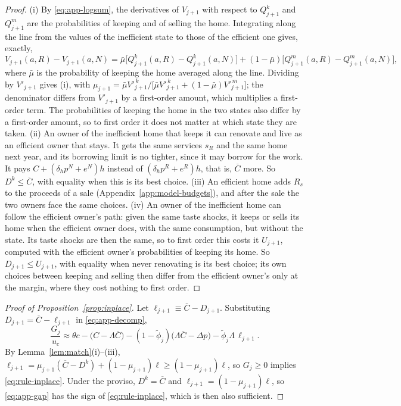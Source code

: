 \begin{proof}
(i) By \eqref{eq:app-logsum}, the derivatives of $V_{j+1}$ with respect to
$Q^k_{j+1}$ and $Q^m_{j+1}$ are the probabilities of keeping and of selling
the home. Integrating along the line from the values of the inefficient
state to those of the efficient one gives, exactly,
\begin{equation*}
  V_{j+1}(a,R)-V_{j+1}(a,N)=\bar\mu\bigl[Q^k_{j+1}(a,R)-Q^k_{j+1}(a,N)\bigr]
  +(1-\bar\mu)\bigl[Q^m_{j+1}(a,R)-Q^m_{j+1}(a,N)\bigr],
\end{equation*}
where $\bar\mu$ is the probability of keeping the home averaged along the
line. Dividing by $V'_{j+1}$ gives (i), with
$\mu_{j+1}=\bar\mu V'^{\,k}_{j+1}/\bigl[\bar\mu V'^{\,k}_{j+1}+(1-\bar\mu)V'^{\,m}_{j+1}\bigr]$;
the denominator differs from $V'_{j+1}$ by a first-order amount, which
multiplies a first-order term. The probabilities of keeping the home in the
two states also differ by a first-order amount, so to first order it does
not matter at which state they are taken. (ii) An owner of the
inefficient home that keeps it can renovate and live as an efficient owner
that stays. It gets the same services $s_R$ and the same home next year,
and its borrowing limit is no tighter, since it may borrow for the work.
It pays $C+(\delta_hp^N+e^N)h$ instead of $(\delta_hp^R+e^R)h$, that is,
$\overline C$ more. So $D^k\le\overline C$, with equality when this is its
best choice. (iii) An efficient home adds $R_s$ to the proceeds of a sale
(Appendix~\ref{app:model-budgets}), and after the sale the two owners face
the same choices. (iv) An owner of the inefficient home can follow the
efficient owner's path: given the same taste shocks, it keeps or sells its
home when the efficient owner does, with the same consumption, but without
the state. Its taste shocks are then the same, so to first order this
costs it $U_{j+1}$, computed with the efficient owner's probabilities of
keeping its home. So $D_{j+1}\le U_{j+1}$, with equality when never
renovating is its best choice; its own choices between keeping and selling
then differ from the efficient owner's only at the margin, where they cost
nothing to first order.
\end{proof}

\begin{proof}[Proof of Proposition~\ref{prop:inplace}]
Let $\ell_{j+1}\equiv\overline C-D_{j+1}$. Substituting
$D_{j+1}=\overline C-\ell_{j+1}$ in \eqref{eq:app-decomp},
\begin{equation}
  \frac{G_j}{u_c}\approx\theta c-\bigl(C-\Lambda\overline C\bigr)
  -(1-\tilde\phi_j)\bigl(\Lambda\overline C-\Delta p\bigr)
  -\tilde\phi_j\Lambda\,\ell_{j+1}.
  \label{eq:app-gap}
\end{equation}
By Lemma~\ref{lem:match}(i)--(iii),
$\ell_{j+1}=\mu_{j+1}(\overline C-D^k)+(1-\mu_{j+1})\ell\ge(1-\mu_{j+1})\ell$,
so $G_j\ge0$ implies \eqref{eq:rule-inplace}. Under the proviso,
$D^k=\overline C$ and $\ell_{j+1}=(1-\mu_{j+1})\ell$, so \eqref{eq:app-gap}
has the sign of \eqref{eq:rule-inplace}, which is then also sufficient.
\end{proof}

